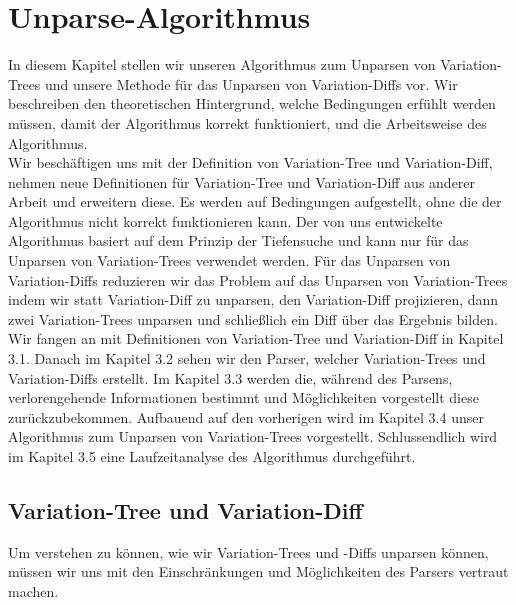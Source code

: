 \chapter{Unparse-Algorithmus}

In diesem Kapitel stellen wir unseren Algorithmus zum Unparsen von Variation-Trees und unsere Methode für das Unparsen von Variation-Diffs vor. Wir beschreiben den theoretischen Hintergrund, welche Bedingungen erfühlt werden müssen, damit der Algorithmus korrekt funktioniert, und die Arbeitsweise des Algorithmus.\\

Wir beschäftigen uns mit der Definition von Variation-Tree und Variation-Diff, nehmen neue Definitionen für Variation-Tree und Variation-Diff aus anderer Arbeit und erweitern diese. Es werden auf Bedingungen aufgestellt, ohne die der Algorithmus nicht korrekt funktionieren kann. Der von uns entwickelte Algorithmus basiert auf dem Prinzip der Tiefensuche und kann nur für das Unparsen von Variation-Trees verwendet werden. Für das Unparsen von Variation-Diffs reduzieren wir das Problem auf das Unparsen von Variation-Trees indem wir statt Variation-Diff zu unparsen, den Variation-Diff projizieren, dann zwei Variation-Trees unparsen und schließlich ein Diff über das Ergebnis bilden.\\

Wir fangen an mit Definitionen von Variation-Tree und Variation-Diff in Kapitel 3.1. Danach im Kapitel 3.2 sehen wir den Parser, welcher Variation-Trees und Variation-Diffs erstellt. Im Kapitel 3.3 werden die, während des Parsens, verlorengehende Informationen bestimmt und Möglichkeiten vorgestellt diese zurückzubekommen. Aufbauend auf den vorherigen wird im Kapitel 3.4 unser Algorithmus zum Unparsen von Variation-Trees vorgestellt. Schlussendlich wird im Kapitel 3.5 eine Laufzeitanalyse des Algorithmus durchgeführt.




\section{Variation-Tree und Variation-Diff}

Um verstehen zu können, wie wir Variation-Trees und -Diffs unparsen können, müssen wir uns mit den Einschränkungen und Möglichkeiten des Parsers vertraut machen.\\


